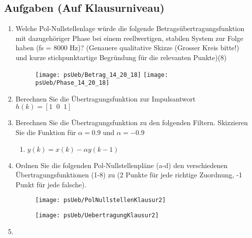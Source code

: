 \subsection{Aufgaben (Auf Klausurniveau)}
\begin{enumerate}
    \item Welche Pol-Nullstellenlage würde die folgende
    Betragsübertragungsfunktion mit dazugehöriger Phase bei einem reellwertigen, stabilen
    System zur Folge haben (fs = 8000 Hz)?
    (Genauere qualitative Skizze (Grosser Kreis bitte!)
    und kurze stichpunktartige Begründung für die relevanten Punkte)(8)
    \begin{figure}[H]
    \begin{center}
    \texttt{[image: psUeb/Betrag\_14\_20\_18]}
    \texttt{[image: psUeb/Phase\_14\_20\_18]}
    \end{center}
    \end{figure}

    \item Berechnen Sie die Übertragungsfunktion zur Impulsantwort $h(k) = [1\;\; 0\;\; 1]$
    \item Berechnen Sie die Übertragungsfunktion zu den folgenden Filtern. Skizzieren Sie
    die Funktion für $\alpha = 0.9$ und $\alpha = -0.9$
    \begin{enumerate}
        \item $y(k) = x(k) - \alpha y(k-1)$
    \end{enumerate}
    \item Ordnen Sie die folgenden Pol-Nullstellenpläne (a-d) den
        verschiedenen Übertragungsfunktionen (1-8) zu (2 Punkte für jede
        richtige Zuordnung, -1 Punkt für jede falsche).
        \begin{figure}[H]
        \begin{center}
        \texttt{[image: psUeb/PolNullstellenKlausur2]}
        \end{center}
        \end{figure}
        \begin{figure}[H]
        \begin{center}
        \texttt{[image: psUeb/UebertragungKlausur2]}
        \end{center}
        \end{figure}
    \item
\end{enumerate}

